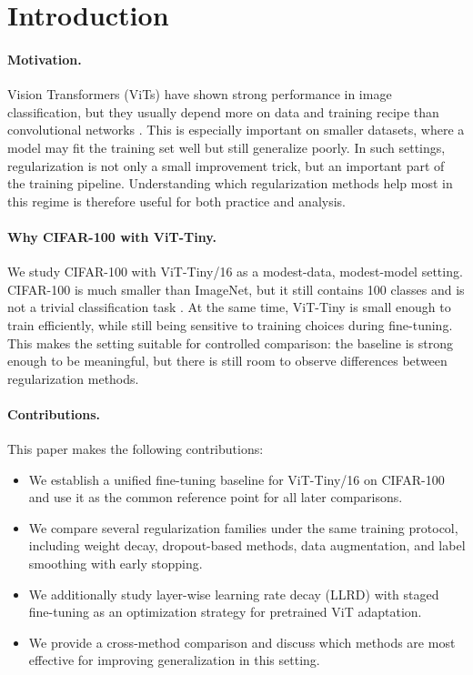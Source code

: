 \section{Introduction}
\label{sec:intro}

\paragraph{Motivation.}
Vision Transformers (ViTs) have shown strong performance in image
classification, but they usually depend more on data and training recipe
than convolutional networks \citep{dosovitskiy2021vit,touvron2021deit}.
This is especially important on smaller datasets, where a model may fit
the training set well but still generalize poorly. In such settings,
regularization is not only a small improvement trick, but an important
part of the training pipeline. Understanding which regularization
methods help most in this regime is therefore useful for both practice
and analysis.

\paragraph{Why CIFAR-100 with ViT-Tiny.}
We study CIFAR-100 with ViT-Tiny/16 as a modest-data, modest-model
setting. CIFAR-100 is much smaller than ImageNet, but it still contains
100 classes and is not a trivial classification task
\citep{krizhevsky2009cifar}. At the same time, ViT-Tiny is small enough
to train efficiently, while still being sensitive to training choices
during fine-tuning. This makes the setting suitable for controlled
comparison: the baseline is strong enough to be meaningful, but there is
still room to observe differences between regularization methods.

\paragraph{Contributions.}
This paper makes the following contributions:
\begin{itemize}
  \item We establish a unified fine-tuning baseline for ViT-Tiny/16 on
        CIFAR-100 and use it as the common reference point for all
        later comparisons.
  \item We compare several regularization families under the same
        training protocol, including weight decay, dropout-based
        methods, data augmentation, and label smoothing with early
        stopping.
  \item We additionally study layer-wise learning rate decay (LLRD) with
        staged fine-tuning as an optimization strategy for pretrained
        ViT adaptation.
  \item We provide a cross-method comparison and discuss which methods
        are most effective for improving generalization in this setting.
\end{itemize}

